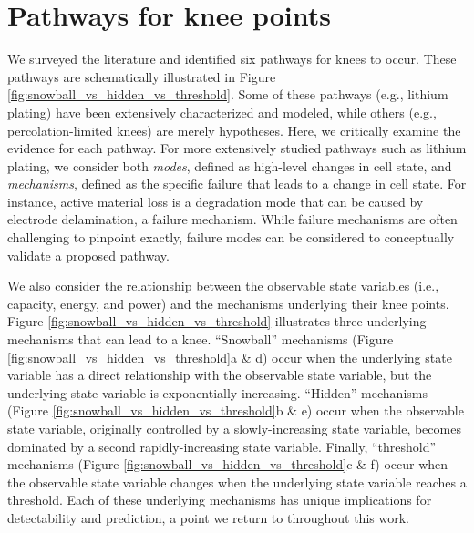 \documentclass{article}
\begin{document}


\section{Pathways for knee points}

We surveyed the literature and identified six pathways for knees to occur. These pathways are schematically illustrated in Figure \ref{fig:snowball_vs_hidden_vs_threshold}. Some of these pathways (e.g., lithium plating) have been extensively characterized and modeled, while others (e.g., percolation-limited knees) are merely hypotheses. Here, we critically examine the evidence for each pathway. For more extensively studied pathways such as lithium plating, we consider both \textit{modes}, defined as high-level changes in cell state, and \textit{mechanisms}, defined as the specific failure that leads to a change in cell state. For instance, active material loss is a degradation mode that can be caused by electrode delamination, a failure mechanism. While failure mechanisms are often challenging to pinpoint exactly, failure modes can be considered to conceptually validate a proposed pathway.

We also consider the relationship between the observable state variables (i.e., capacity, energy, and power) and the mechanisms underlying their knee points. Figure \ref{fig:snowball_vs_hidden_vs_threshold} illustrates three underlying mechanisms that can lead to a knee. ``Snowball'' mechanisms (Figure \ref{fig:snowball_vs_hidden_vs_threshold}a \& d) occur when the underlying state variable has a direct relationship with the observable state variable, but the underlying state variable is exponentially increasing. ``Hidden'' mechanisms (Figure \ref{fig:snowball_vs_hidden_vs_threshold}b \& e) occur when the observable state variable, originally controlled by a slowly-increasing state variable, becomes dominated by a second rapidly-increasing state variable. Finally, ``threshold'' mechanisms (Figure \ref{fig:snowball_vs_hidden_vs_threshold}c \& f) occur when the observable state variable changes when the underlying state variable reaches a threshold. Each of these underlying mechanisms has unique implications for detectability and prediction, a point we return to throughout this work.
\end{document}
